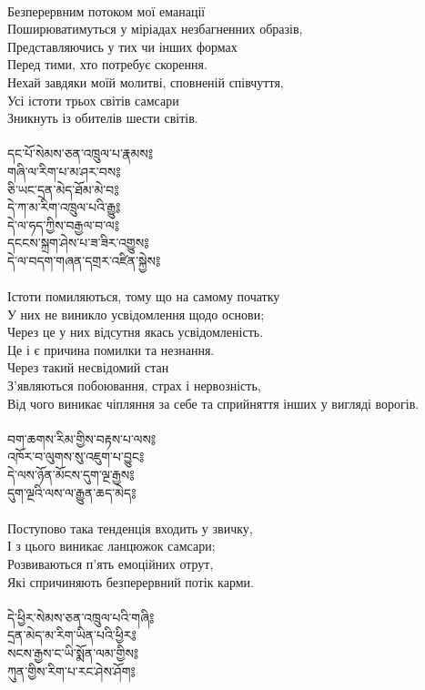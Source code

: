 \\
Безперервним потоком мої еманації \\
Поширюватимуться у міріадах незбагненних образів, \\
Представляючись у тих чи інших формах \\
Перед тими, хто потребує скорення. \\
Нехай завдяки моїй молитві, сповненій співчуття, \\
Усі істоти трьох світів самсари \\
Зникнуть із обителів шести світів. \\
\\
\newpage
{\ti
དང་པོ་སེམས་ཅན་འཁྲུལ་པ་རྣམས༔ \\
གཞི་ལ་རིག་པ་མ་ཤར་བས༔ \\
ཅི་ཡང་དྲན་མེད་ཐོམ་མེ་བ༔ \\
དེ་ཀ་མ་རིག་འཁྲུལ་པའི་རྒྱུ༔ \\
དེ་ལ་ཧད་ཀྱིས་བརྒྱལ་བ་ལ༔ \\
དངངས་སྐྲག་ཤེས་པ་ཟ་ཟིར་འགྱུས༔ \\
དེ་ལ་བདག་གཞན་དགྲར་འཛིན་སྐྱེས༔}\\
\\
Істоти помиляються, тому що на самому початку \\
У них не виникло усвідомлення щодо основи; \\
Через це у них відсутня якась усвідомленість. \\
Це і є причина помилки та незнання. \\
Через такий несвідомий стан \\
З'являються побоювання, страх і нервозність, \\
Від чого виникає чіпляння за себе та сприйняття інших у вигляді ворогів. \\
\\
{\ti
བག་ཆགས་རིམ་གྱིས་བརྟས་པ་ལས༔ \\
འཁོར་བ་ལུགས་སུ་འཇུག་པ་བྱུང༔ \\
དེ་ལས་ཉོན་མོངས་དུག་ལྔ་རྒྱས༔ \\
དུག་ལྔའི་ལས་ལ་རྒྱུན་ཆད་མེད༔}\\
\\
Поступово така тенденція входить у звичку, \\
І з цього виникає ланцюжок самсари; \\
Розвиваються п'ять емоційних отрут, \\
Які спричиняють безперервний потік карми. \\
\\
\newpage
{\ti
དེ་ཕྱིར་སེམས་ཅན་འཁྲུལ་པའི་གཞི༔ \\
དྲན་མེད་མ་རིག་ཡིན་པའི་ཕྱིར༔ \\
སངས་རྒྱས་ང་ཡི་སྨོན་ལམ་གྱིས༔ \\
ཀུན་གྱིས་རིག་པ་རང་ཤེས་ཤོག༔}\\

